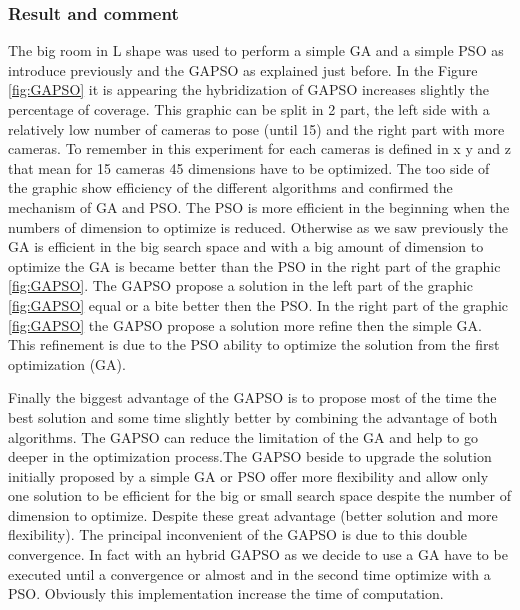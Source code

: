 \subsubsection{Result and comment}
  

The big room in L shape was used to perform a simple GA and a simple PSO as introduce previously and the GAPSO as explained just before. In the Figure \ref{fig:GAPSO} it is appearing the hybridization of GAPSO increases slightly the percentage of coverage.%
This graphic can be split in 2 part, the left side with a relatively low number of cameras to pose (until 15) and the right part with more cameras. To remember in this experiment for each cameras is defined in x y and z that mean for 15 cameras 45 dimensions have to be optimized.
The too side of the graphic show efficiency  of the different algorithms and confirmed  the mechanism of GA and PSO.
The PSO is more efficient in the beginning when the numbers of dimension to optimize is reduced. Otherwise as we saw previously the GA is efficient in the big search space and with a big amount of dimension to optimize the GA is became better than the PSO in the right part of the graphic \ref{fig:GAPSO}. 
The GAPSO propose a solution in the left part of the graphic \ref{fig:GAPSO} equal or a bite better then the PSO. In the right part of the graphic \ref{fig:GAPSO} the GAPSO propose a solution more refine then the simple GA. This refinement is due to the PSO ability to optimize the solution from the first optimization (GA). 

Finally the biggest advantage of the GAPSO is to propose  most of the time the best solution and some time slightly better by combining the advantage of both algorithms. 
The GAPSO can reduce the limitation of the GA and help to go deeper in the optimization process.The GAPSO  beside to upgrade the solution initially proposed by a simple GA or PSO offer more flexibility and allow only one solution to be efficient for the big or small search space despite the number of dimension to optimize.
Despite these great advantage (better solution and more flexibility).
The principal inconvenient of the GAPSO is due to this double convergence. In fact with an hybrid GAPSO as we decide to use a GA have to be executed until a convergence or almost and in the second time optimize with a PSO.  Obviously this implementation increase the time of computation.
 
